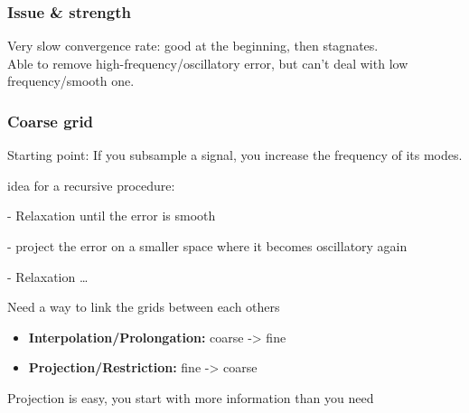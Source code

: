 \documentclass{article}
\begin{document}
\subsubsection*{Issue \& strength}
Very slow convergence rate: good at the beginning, then stagnates. \\ 
Able to remove high-frequency/oscillatory error, but can't deal with low frequency/smooth one.








\subsubsection*{Coarse grid}

Starting point: If you subsample a signal, you increase the frequency of its modes.

idea for a recursive procedure:

- Relaxation until the error is smooth

- project the error on a smaller space where it becomes oscillatory again

- Relaxation \dots

Need a way to link the grids between each others

\begin{itemize}
    \item \textbf{Interpolation/Prolongation:} coarse -> fine
    \item \textbf{Projection/Restriction:} fine -> coarse
\end{itemize}

Projection is easy, you start with more information than you need
\end{document}
